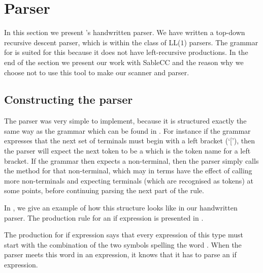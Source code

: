 \section{Parser}
\label{sec:parserimplementation}

In this section we present \productname{}'s handwritten parser. We have
written a top-down recursive descent parser, which is within the class
of LL($1$) parsers. The grammar for \productname{} is suited for this
because it does not have left-recursive productions. In the end of
the section we present our work with SableCC and the reason why we choose
not to use this tool to make our scanner and parser.

\subsection{Constructing the parser}
The parser was very simple to implement, because it is structured exactly the same way as the
grammar which can be found in .  For instance if the grammar
expresses that the next set of terminals must begin with a left bracket (`['),
  then the parser will expect the next token to be a  which
  is the token name for a left bracket. If the grammar then expects a
  non-terminal, then the parser simply calls the method for that non-terminal,
  which may in terms have the effect of calling more non-terminals and expecting terminals (which are recognised as tokens) at some points, 
  before continuing parsing the next part of the rule.

In , we give an example of how this structure looks like in
our handwritten parser. The production rule for an if expression is presented in
.


The production for if expression says that every expression of this type
must start with the combination of the two symbols spelling the word
. When the parser meets this word in an expression, it knows
that it has to parse an if expression.



